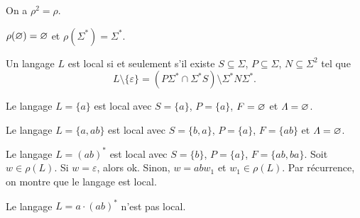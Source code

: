 \begin{crlr}
	On a $\rho^2 = \rho$.
\end{crlr}


\begin{prv}
	$\rho(\varnothing) = \varnothing$\/ et $\rho(\Sigma^*) = \Sigma^*$.
\end{prv}

\begin{rmk}
	Un langage $L$\/ est local si et seulement s'il existe $S \subseteq \Sigma$, $P \subseteq \Sigma$, $N \subseteq \Sigma^2$\/ tel que \[
		L \setminus \{\varepsilon\} = (P \Sigma^* \cap \Sigma^* S) \setminus \Sigma^* N \Sigma^*
	.\]
\end{rmk}

\begin{exm}
	Le langage $L = \{a\}$\/ est local avec $S = \{a\}$, $P = \{a\}$, $F = \varnothing$\/ et $\varLambda = \varnothing$.

	\noindent Le langage $L = \{a,ab\}$\/ est local avec $S = \{b,a\}$, $P = \{a\}$, $F = \{ab\}$\/ et $\varLambda = \varnothing$.

	\noindent Le langage $L = (ab)^*$\/ est local avec $S = \{b\}$, $P = \{a\}$, $F = \{ab,ba\}$. Soit $w \in \rho(L)$. Si $w = \varepsilon$, alors {\sc ok}. Sinon, $w = ab w_1$\/ et $w_1 \in \rho(L)$. Par récurrence, on montre que le langage est local.

	\noindent Le langage $L = a \cdot (ab)^*$\/ n'est pas local.
\end{exm}

